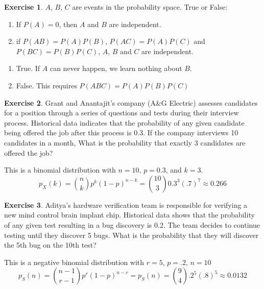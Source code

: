 \documentclass[12pt]{amsart}
\theoremstyle{definition}
\newtheorem{exercise}{Exercise}
\numberwithin{equation}{section}
\theoremstyle{plain}
\begin{document}
 

\begin{exercise}
    $A$, $B$, $C$ are events in the probability space. True or False:
    \begin{enumerate}[]
        \item If $P(A)=0$, then $A$ and $B$ are independent.
        \item if $P(AB) = P(A)P(B)$, $P(AC) = P(A)P(C)$ and $P(BC) = P(B)P(C)$, $A$, $B$ and $C$ are independent. 
    \end{enumerate}
    \begin{answer}
        \begin{enumerate}
            \item True. If $A$ can never happen, we learn nothing about $B$.
            \item False. This requires $P(ABC) = P(A) P(B) P(C)$
        \end{enumerate}
    \end{answer}
\end{exercise}

 

\begin{exercise}
    Grant and Anantajit's company (A\&G Electric) assesses candidates for a position through a series of questions and tests during their interview process. Historical data indicates that the probability of any given candidate being offered the job after this process is 0.3. If the company interviews 10 candidates in a month, What is the probability that exactly 3 candidates are offered the job?%
    \begin{answer}
    This is a binomial distribution with $n = 10$, $p = 0.3$, and $k = 3$.
    $$ p_X(k) = {n\choose k}p^k(1-p)^{n-k} = {10\choose 3}0.3^3(.7)^7 \approx 0.266$$
    \end{answer}
\end{exercise}

 

\begin{exercise}
    Aditya's hardware verification team is responsible for verifying a new mind control brain implant chip. Historical data shows that the probability of any given test resulting in a bug discovery is 0.2. The team decides to continue testing until they discover 5 bugs. What is the probability that they will discover the 5th bug on the 10th test?%
    \begin{answer}
    This is a negative binomial distribution with $r = 5$, $p = .2$, $n=10$
    $$ p_S(n) = {n - 1\choose r - 1}p^r(1-p)^{n-r} = p_S(n) = {9\choose 4}.2^5(.8)^{5}\approx 0.0132$$
    
    \end{answer}
\end{exercise}
\end{document}
